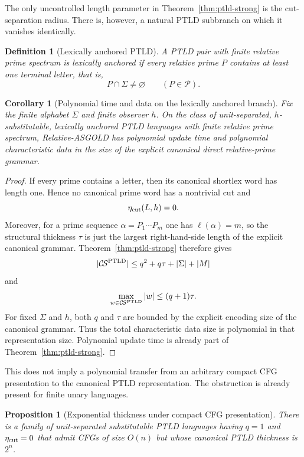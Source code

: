 \documentclass[11pt,a4paper]{article}
\newtheorem{proposition}[theorem]{Proposition}
\newtheorem{corollary}[theorem]{Corollary}
\newtheorem{definition}[theorem]{Definition}
\newcommand{\Pcal}{\mathcal P}
\newcommand{\CS}{\mathcal{C}\!\mathcal{S}}
\begin{document}
The only uncontrolled length parameter in Theorem~\ref{thm:ptld-strong}
is the cut-separation radius.  There is, however, a natural PTLD subbranch
on which it vanishes identically.

\begin{definition}[Lexically anchored PTLD]
A PTLD pair with finite relative prime spectrum is \emph{lexically
anchored} if every relative prime $P$ contains at least one terminal
letter, that is,
\[
  P\cap\Sigma\ne\varnothing
  \qquad(P\in\Pcal).
\]
\end{definition}

\begin{corollary}[Polynomial time and data on the lexically anchored branch]
\label{cor:lexically-anchored-polynomial}
Fix the finite alphabet $\Sigma$ and finite observer $h$.  On the class of
unit-separated, $h$-substitutable, lexically anchored PTLD languages with
finite relative prime spectrum, Relative-ASGOLD has polynomial update time
and polynomial characteristic data in the size of the explicit canonical
direct relative-prime grammar.
\end{corollary}

\begin{proof}
If every prime contains a letter, then its canonical shortlex word has
length one.  Hence no canonical prime word has a nontrivial cut and
\[
  \eta_{\rm cut}(L,h)=0.
\]
Moreover, for a prime sequence $\alpha=P_1\cdots P_m$ one has
$\ell(\alpha)=m$, so the structural thickness $\tau$ is just the largest
right-hand-side length of the explicit canonical grammar.  Theorem~\ref{thm:ptld-strong}
therefore gives
\[
  |\CS^{\rm PTLD}|\le q^2+q\tau+|\Sigma|+|M|
\]
and
\[
  \max_{w\in\CS^{\rm PTLD}}|w|\le(q+1)\tau.
\]
For fixed $\Sigma$ and $h$, both $q$ and $\tau$ are bounded by the explicit
encoding size of the canonical grammar.  Thus the total characteristic
data size is polynomial in that representation size.  Polynomial update
time is already part of Theorem~\ref{thm:ptld-strong}.
\end{proof}

This does not imply a polynomial transfer from an arbitrary compact CFG
presentation to the canonical PTLD representation.  The obstruction is
already present for finite unary languages.

\begin{proposition}[Exponential thickness under compact CFG presentation]
\label{prop:compact-thickness-obstruction}
There is a family of unit-separated substitutable PTLD languages having
$q=1$ and $\eta_{\rm cut}=0$ that admit CFGs of size $O(n)$ but whose
canonical PTLD thickness is $2^n$.
\end{proposition}
\end{document}
